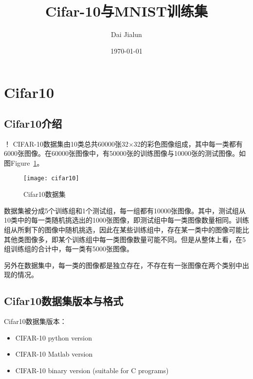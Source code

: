 

\title{\vspace{-2em} Cifar-10与MNIST训练集\\
\normalsize{}}
\author{Dai Jialun}
\date{\vspace{-0.7em} \today \vspace{-0.7em}}
\maketitle\thispagestyle{fancy}
\maketitle
\section{Cifar10}
\subsection{Cifar10介绍}！
CIFAR-10数据集由10类总共60000张32$\times$32的彩色图像组成，其中每一类都有6000张图像。在60000张图像中，有50000张的训练图像与10000张的测试图像。如图Figure~\ref{fig:introduction}。

\begin{figure}[!ht]
\centering
\texttt{[image: cifar10]}
\caption{Cifar10数据集}
\label{fig:introduction}
\end{figure}

数据集被分成5个训练组和1个测试组，每一组都有10000张图像。其中，测试组从10类中的每一类随机挑选出的1000张图像，即测试组中每一类图像数量相同。训练组从所剩下的图像中随机挑选，因此在某些训练组中，存在某一类中的图像可能比其他类图像多，即某个训练组中每一类图像数量可能不同。但是从整体上看，在5组训练组的合计中，每一类有5000张图像。

另外在数据集中，每一类的图像都是独立存在，不存在有一张图像在两个类别中出现的情况。


\subsection{Cifar10数据集版本与格式}
Cifar10数据集版本：
\begin{itemize}
\item CIFAR-10 python version
\item CIFAR-10 Matlab version
\item CIFAR-10 binary version (suitable for C programs)
\end{itemize}

